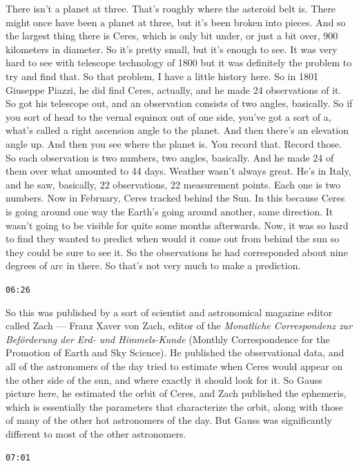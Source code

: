 \documentclass[11pt,a4paper]{article}
\newcommand{\timestamp}[1]{%
  \par\vspace{0.35em}%
  \noindent\colorbox{timestampback}{\textcolor{timestampblue}{\small\texttt{#1}}}%
  \par\vspace{0.2em}%
}
\begin{document}
There isn't a planet at three. That's roughly where the asteroid belt is. There might once have been a planet at three, but it's been broken into pieces. And so the largest thing there is Ceres, which is only bit under, or just a bit over, 900 kilometers in diameter. So it's pretty small, but it's enough to see. It was very hard to see with telescope technology of 1800 but it was definitely the problem to try and find that. So that problem, I have a little history here. So in 1801 Giuseppe Piazzi, he did find Ceres, actually, and he made 24 observations of it. So got his telescope out, and an observation consists of two angles, basically. So if you sort of head to the vernal equinox out of one side, you've got a sort of a, what's called a right ascension angle to the planet. And then there's an elevation angle up. And then you see where the planet is. You record that. Record those. So each observation is two numbers, two angles, basically. And he made 24 of them over what amounted to 44 days. Weather wasn't always great. He's in Italy, and he saw, basically, 22 observations, 22 measurement points. Each one is two numbers. Now in February, Ceres tracked behind the Sun. In this because Ceres is going around one way the Earth's going around another, same direction. It wasn't going to be visible for quite some months afterwards. Now, it was so hard to find they wanted to predict when would it come out from behind the sun so they could be sure to see it. So the observations he had corresponded about nine degrees of arc in there. So that's not very much to make a prediction.



\timestamp{06:26}

So this was published by a sort of scientist and astronomical magazine editor called Zach --- Franz Xaver von Zach, editor of the \textit{Monatliche Correspondenz zur Bef\"orderung der Erd- und Himmels-Kunde} (Monthly Correspondence for the Promotion of Earth and Sky Science). He published the observational data, and all of the astronomers of the day tried to estimate when Ceres would appear on the other side of the sun, and where exactly it should look for it. So Gauss picture here, he estimated the orbit of Ceres, and Zach published the ephemeris, which is essentially the parameters that characterize the orbit, along with those of many of the other hot astronomers of the day. But Gauss was significantly different to most of the other astronomers.



\timestamp{07:01}
\end{document}
